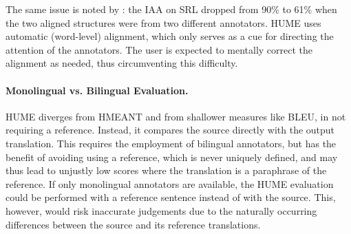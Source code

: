 \documentclass[11pt,letterpaper]{article}
\newcommand{\com}[1]{}
\newcommand{\oa}[1]{\footnote{\color{red}OA: #1}}
\newcommand{\bh}[1]{\footnote{\color{blue}BH: #1}}
\def\perscite#1{\newcite{#1}}
\begin{document}
The same issue is noted by \perscite{lo:wu:reliability:2014}:
the IAA on SRL dropped from 90\% to 61\% 
when the two aligned structures were from two different annotators.
HUME uses automatic (word-level) alignment, which only
serves as a cue for directing the attention of the annotators.
The user is expected to mentally correct the
alignment as needed, thus circumventing this difficulty.





\paragraph{Monolingual vs. Bilingual Evaluation.}
\label{src-vs-ref}
HUME diverges from HMEANT and from shallower measures
like BLEU, in not requiring a reference.
Instead, it compares the source directly with the output translation.
This requires the employment of bilingual annotators, but has the benefit of avoiding
using a reference, which is never uniquely defined, and may thus 
lead to unjustly low scores where the translation is a paraphrase of the reference.
If only monolingual annotators are available, the HUME evaluation could be performed
with a reference sentence instead of with the source. This, however,
would risk inaccurate judgements due to the naturally occurring differences
between the source and its reference translations.




\com{
\paragraph{Error Localisation.}
In HMEANT, an error in a child node often results in the parent node
being penalised as well. This makes it harder to quantify the true scale of  
the original error, as its effect gets propagated up the tree. 
In HUME, errors are localised as much as possible to where they occur,
by the separation of atomic and structural units,
which supports a more accurate aggregation of the translation errors
to a composite score.
}
\end{document}

